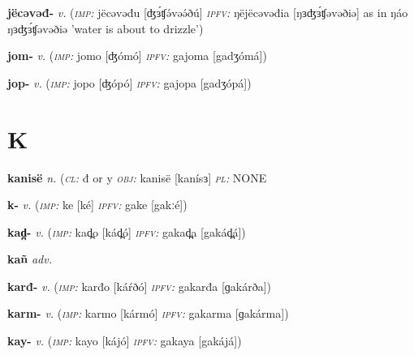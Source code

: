 \newentry
\headword\textbf{jëcəvəđ-}
\ipa{[ʤɜ́ʧəvəð-]}
\synpos\textit{v.} 
\imperative(\textit {\textsc{imp:}} jëcəvəđu [ʤɜ́ʧə́vəə́ðú] 
\imperfective\textit{\textsc{ipfv:}} ŋëjëcəvəđia [ŋɜʤɜ́ʧəvəðiə] as in ŋáo ŋɜʤɜ́ʧəvəðiə 'water is about to drizzle') %

\newentry
\headword\textbf{jom-}
\ipa{[dʒóm-]}
\synpos\textit{v.} 
\imperative(\textit {\textsc{imp:}} jomo [ʤómó] 
\imperfective\textit{\textsc{ipfv:}} gajoma [gadʒómá])

\newentry
\headword\textbf{jop-}
\ipa{[dʒóp-]}
\synpos\textit{v.} 
\imperative(\textit {\textsc{imp:}} jopo [ʤópó] 
\imperfective\textit{\textsc{ipfv:}} gajopa [gadʒópá])

\section*{K}\label{K}


\newentry
\headword\textbf{kanisë} 
\ipa{[kanísɜ]}
\synpos\textit{n.} 
\class(\textit{\textsc{cl:}} {đ or y}
\object\textit{\textsc{obj:}} kanisë [kanísɜ]
\plural\textit{\textsc{pl:}} NONE


\newentry
\headword\textbf{k-}  
\ipa{[k-]}
\synpos\textit{v.} 
\imperative(\textit {\textsc{imp:}} ke [ké]
\imperfective\textit{\textsc{ipfv:}} gake [gakːé]) %


\newentry
\headword\textbf{kad̪-}  
\ipa{[kád̪-]}
\synpos\textit{v.} 
\imperative(\textit {\textsc{imp:}} kad̪o [kád̪ó]
\imperfective\textit{\textsc{ipfv:}} gakad̪a [gakád̪á])

\newentry
\headword\textbf{kañ}  
\ipa{[káɲ]}
\synpos\textit{adv.} 

\newentry
\headword\textbf{karđ-}  
\ipa{[káŕð-]}
\synpos\textit{v.} 
\imperative(\textit {\textsc{imp:}} karđo [káŕðó]
\imperfective\textit{\textsc{ipfv:}} gakarđa [ɡakárða])


\newentry
\headword\textbf{karm-}  
\ipa{[kárm-]}
\synpos\textit{v.} 
\imperative(\textit {\textsc{imp:}} karmo [kármó]
\imperfective\textit{\textsc{ipfv:}} gakarma [ɡakárma])

\newentry
\headword\textbf{kay-}  
\ipa{[káj-]}
\synpos\textit{v.} 
\imperative(\textit {\textsc{imp:}} kayo [kájó]
\imperfective\textit{\textsc{ipfv:}} gakaya [gakájá])


